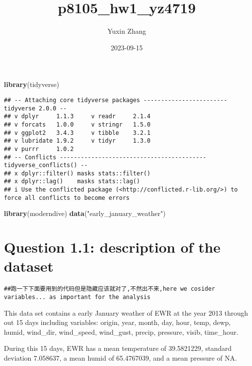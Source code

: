 \documentclass[
]{article}
\title{p8105\_hw1\_yz4719}
\author{Yuxin Zhang}
\date{2023-09-15}
\newenvironment{Shaded}{\begin{snugshade}}{\end{snugshade}}
\newcommand{\FunctionTok}[1]{\textcolor[rgb]{0.13,0.29,0.53}{\textbf{#1}}}
\newcommand{\NormalTok}[1]{#1}
\newcommand{\StringTok}[1]{\textcolor[rgb]{0.31,0.60,0.02}{#1}}
\begin{document}
\maketitle

\begin{Shaded}
\begin{Highlighting}[]
\FunctionTok{library}\NormalTok{(tidyverse)}
\end{Highlighting}
\end{Shaded}

\begin{verbatim}
## -- Attaching core tidyverse packages ------------------------ tidyverse 2.0.0 --
## v dplyr     1.1.3     v readr     2.1.4
## v forcats   1.0.0     v stringr   1.5.0
## v ggplot2   3.4.3     v tibble    3.2.1
## v lubridate 1.9.2     v tidyr     1.3.0
## v purrr     1.0.2     
## -- Conflicts ------------------------------------------ tidyverse_conflicts() --
## x dplyr::filter() masks stats::filter()
## x dplyr::lag()    masks stats::lag()
## i Use the conflicted package (<http://conflicted.r-lib.org/>) to force all conflicts to become errors
\end{verbatim}

\begin{Shaded}
\begin{Highlighting}[]
\FunctionTok{library}\NormalTok{(moderndive)}
\FunctionTok{data}\NormalTok{(}\StringTok{"early\_january\_weather"}\NormalTok{)}
\end{Highlighting}
\end{Shaded}

\hypertarget{question-1.1-description-of-the-dataset}{%
\section{Question 1.1: description of the
dataset}\label{question-1.1-description-of-the-dataset}}

\begin{verbatim}
##跑一下下面要用到的代码但是隐藏应该就对了,不然出不来,here we cosider variables... as important for the analysis
\end{verbatim}

This data set contains a early January weather of EWR at the year 2013
through out 15 days including variables: origin, year, month, day, hour,
temp, dewp, humid, wind\_dir, wind\_speed, wind\_gust, precip, pressure,
visib, time\_hour.

During this 15 days, EWR has a mean temperature of 39.5821229, standard
deviation 7.058637, a mean humid of 65.4767039, and a mean pressure of
NA.
\end{document}
